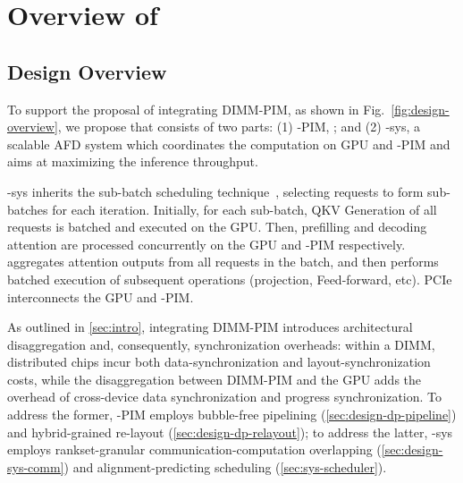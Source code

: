 \section{Overview of \sys}



\subsection{Design Overview}
To support the proposal of integrating DIMM-PIM, as shown in Fig.~\ref{fig:design-overview}, we propose \sys that consists of two parts: 
(1) \sys-PIM, ; and
(2) \sys-sys, a scalable AFD system which coordinates the computation on GPU and \sys-PIM and aims at maximizing the inference throughput.


\sys-sys inherits the sub-batch scheduling technique~\cite{heo2024neupims,jiang2024neo}, selecting requests to form sub-batches for each iteration.
Initially, for each sub-batch, QKV Generation of all requests is batched and executed on the GPU. 
Then, prefilling and decoding attention are processed concurrently on the GPU and \sys-PIM respectively. 
\sys aggregates attention outputs from all requests in the batch, and then performs batched execution of subsequent operations (projection, Feed-forward, etc). 
PCIe interconnects the GPU and \sys-PIM.

As outlined in \textsection\ref{sec:intro}, integrating DIMM-PIM introduces architectural disaggregation and, 
consequently, synchronization overheads: 
within a DIMM, distributed chips incur both data-synchronization and layout-synchronization costs, while the disaggregation between DIMM-PIM and the GPU adds the overhead of cross-device data synchronization and progress synchronization. 
To address the former, \sys-PIM employs bubble-free pipelining (\textsection\ref{sec:design-dp-pipeline}) and hybrid-grained re-layout (\textsection\ref{sec:design-dp-relayout}); 
to address the latter, \sys-sys employs rankset-granular communication-computation overlapping (\textsection\ref{sec:design-sys-comm}) and alignment-predicting scheduling (\textsection\ref{sec:sys-scheduler}).









